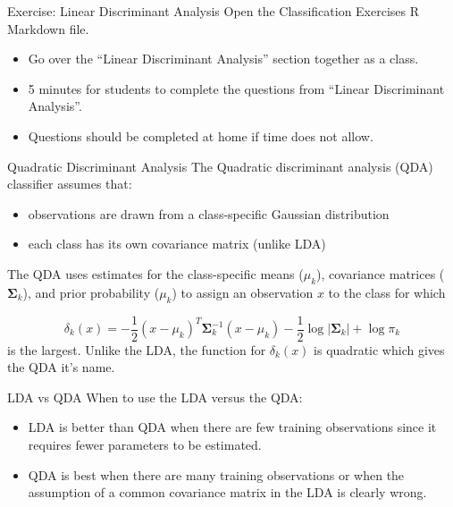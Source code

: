 \documentclass[
  ignorenonframetext,
  aspectratio=169,
]{beamer}
\begin{document}
\begin{frame}{Exercise: Linear Discriminant Analysis}
\protect\hypertarget{exercise-linear-discriminant-analysis}{}
Open the Classification Exercises R Markdown file.

\begin{itemize}
\item
  Go over the ``Linear Discriminant Analysis'' section together as a
  class.
\item
  5 minutes for students to complete the questions from ``Linear
  Discriminant Analysis''.
\item
  Questions should be completed at home if time does not allow.
\end{itemize}
\end{frame}

\begin{frame}{Quadratic Discriminant Analysis}
\protect\hypertarget{quadratic-discriminant-analysis}{}
The Quadratic discriminant analysis (QDA) classifier assumes that:

\begin{itemize}
\item
  observations are drawn from a class-specific Gaussian distribution
\item
  each class has its own covariance matrix (unlike LDA)
\end{itemize}

The QDA uses estimates for the class-specific means (\(\mu_k\)),
covariance matrices (\(\boldsymbol{\Sigma}_{k}\)), and prior probability
(\(\mu_k\)) to assign an observation \(x\) to the class for which

\[
\delta_{k}(x)=-\frac{1}{2}\left(x-\mu_{k}\right)^{T} \boldsymbol{\Sigma}_{k}^{-1}\left(x-\mu_{k}\right)-\frac{1}{2} \log \left|\boldsymbol{\Sigma}_{k}\right|+\log \pi_{k}
\] is the largest. Unlike the LDA, the function for \(\delta_{k}(x)\) is
quadratic which gives the QDA it's name.
\end{frame}

\begin{frame}{LDA vs QDA}
\protect\hypertarget{lda-vs-qda}{}
When to use the LDA versus the QDA:

\begin{itemize}
\item
  LDA is better than QDA when there are few training observations since
  it requires fewer parameters to be estimated.
\item
  QDA is best when there are many training observations or when the
  assumption of a common covariance matrix in the LDA is clearly wrong.
\end{itemize}
\end{frame}
\end{document}
